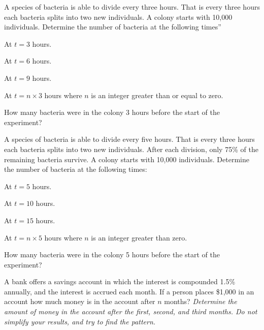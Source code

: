 \begin{problem}
\item A species of bacteria is able to divide every three hours. That
  is every three hours each bacteria splits into two new
  individuals. A colony starts with 10,000 individuals. Determine the
  number of bacteria at the following times''
  \begin{subproblem}
  \item At $t=3$ hours.
    \vfill
  \item At $t=6$ hours.
    \vfill
  \item At $t=9$ hours.
    \vfill
  \item At $t=n\times 3$ hours where $n$ is an integer greater than or equal to zero.
    \vfill
  \item How many bacteria were in the colony 3 hours before the start
    of the experiment?
    \vfill
  \end{subproblem}

  \clearpage

\item A species of bacteria is able to divide every five hours. That
  is every three hours each bacteria splits into two new
  individuals. After each division, only 75\% of the remaining
  bacteria survive. A colony starts with 10,000 individuals. Determine
  the number of bacteria at the following times:
  \begin{subproblem}
  \item At $t=5$ hours.
    \vfill
  \item At $t=10$ hours.
    \vfill
  \item At $t=15$ hours.
    \vfill
  \item At $t=n\times 5$ hours where $n$ is an integer greater than zero.
    \vfill
  \item How many bacteria were in the colony 5 hours before the start
    of the experiment?
    \vfill
  \end{subproblem}

  \clearpage

\item A bank offers a savings account in which the interest is
  compounded 1.5\% annually, and the interest is accrued each
  month. If a person places \$1,000 in an account how much money is in
  the account after $n$ months?
  \textit{Determine the amount of money in the account after the
    first, second, and third months. Do not simplify your results, and
  try to find the pattern.}


\end{problem}
